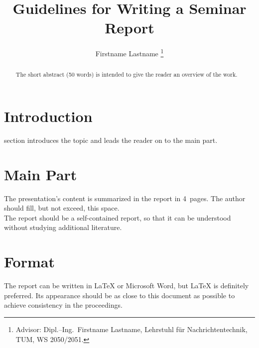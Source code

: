 \documentclass[journal, a4paper]{IEEEtran}
\begin{document}
\title{Guidelines for Writing a Seminar Report}
\author{Firstname Lastname
    \thanks{Advisor: Dipl.--Ing.~Firstname Lastname, Lehrstuhl f\"ur Nachrichtentechnik, TUM, WS 2050/2051.}}
    \maketitle

    \begin{abstract}
        The short abstract (50  words) is intended to give the reader an overview of the work.
    \end{abstract}

    \section{Introduction}
     section introduces the topic and leads the reader on to the main part.

    \section{Main Part}
    The presentation's content is summarized in the report in 4~pages.
    The author should fill, but not exceed, this space. \\
    The report should be a self-contained report, so that it can be understood without studying additional literature.

    \section{Format}
    The report can be written in \LaTeX{} or Microsoft Word, but \LaTeX{} is definitely preferred.
    Its appearance should be as close to this document as possible to achieve consistency in the proceedings.
\end{document}
